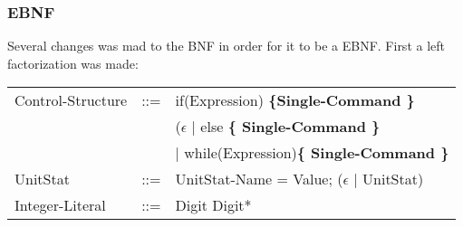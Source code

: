 	\subsubsection{EBNF}
		Several changes was mad to the BNF in order for it to be a EBNF. First a left factorization was made:
		\begin{tabular}{ l l l }
			Control-Structure  &  	::=  & if(Expression) \bf{\{}Single-Command \bf{\}}  \\
							   &  	     & ($\epsilon$ $\mid$ else \bf{\{ }Single-Command \bf{\} } \\					   
							   &   		 & $\mid$ while(Expression)\bf{\{ } Single-Command \bf{\}} \\
	  		UnitStat		   &	::=  & UnitStat-Name = Value; ($\epsilon$ $\mid$ UnitStat) \\
			Integer-Literal    &	::=  & Digit Digit* 
			
								
		\end{tabular}
							   
							   